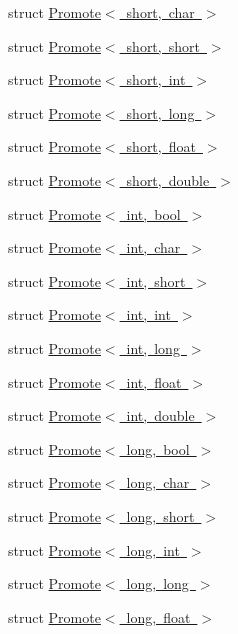 \begin{DoxyCompactItemize}
struct \mbox{\hyperlink{structPromote_3_01short_00_01char_01_4}{Promote$<$ short, char $>$}}
\item 
struct \mbox{\hyperlink{structPromote_3_01short_00_01short_01_4}{Promote$<$ short, short $>$}}
\item 
struct \mbox{\hyperlink{structPromote_3_01short_00_01int_01_4}{Promote$<$ short, int $>$}}
\item 
struct \mbox{\hyperlink{structPromote_3_01short_00_01long_01_4}{Promote$<$ short, long $>$}}
\item 
struct \mbox{\hyperlink{structPromote_3_01short_00_01float_01_4}{Promote$<$ short, float $>$}}
\item 
struct \mbox{\hyperlink{structPromote_3_01short_00_01double_01_4}{Promote$<$ short, double $>$}}
\item 
struct \mbox{\hyperlink{structPromote_3_01int_00_01bool_01_4}{Promote$<$ int, bool $>$}}
\item 
struct \mbox{\hyperlink{structPromote_3_01int_00_01char_01_4}{Promote$<$ int, char $>$}}
\item 
struct \mbox{\hyperlink{structPromote_3_01int_00_01short_01_4}{Promote$<$ int, short $>$}}
\item 
struct \mbox{\hyperlink{structPromote_3_01int_00_01int_01_4}{Promote$<$ int, int $>$}}
\item 
struct \mbox{\hyperlink{structPromote_3_01int_00_01long_01_4}{Promote$<$ int, long $>$}}
\item 
struct \mbox{\hyperlink{structPromote_3_01int_00_01float_01_4}{Promote$<$ int, float $>$}}
\item 
struct \mbox{\hyperlink{structPromote_3_01int_00_01double_01_4}{Promote$<$ int, double $>$}}
\item 
struct \mbox{\hyperlink{structPromote_3_01long_00_01bool_01_4}{Promote$<$ long, bool $>$}}
\item 
struct \mbox{\hyperlink{structPromote_3_01long_00_01char_01_4}{Promote$<$ long, char $>$}}
\item 
struct \mbox{\hyperlink{structPromote_3_01long_00_01short_01_4}{Promote$<$ long, short $>$}}
\item 
struct \mbox{\hyperlink{structPromote_3_01long_00_01int_01_4}{Promote$<$ long, int $>$}}
\item 
struct \mbox{\hyperlink{structPromote_3_01long_00_01long_01_4}{Promote$<$ long, long $>$}}
\item 
struct \mbox{\hyperlink{structPromote_3_01long_00_01float_01_4}{Promote$<$ long, float $>$}}
\item 

\end{DoxyCompactItemize}
